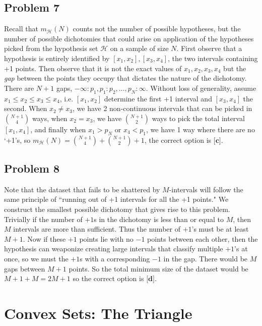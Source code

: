 \documentclass{article}
\begin{document}
\subsection*{Problem 7}
Recall that $m_{\mathcal{H}}(N)$ counts not the number of possible hypotheses, but the number of possible dichotomies that could arise on application of the hypotheses picked from the hypothesis set $\mathcal{H}$ on a sample of size $N$. First observe that a hypothesis is entirely identified by $[x_{1}, x_{2}], [x_{3},x_{4}]$, the two intervals containing +1 points. Then observe that it is not the exact values of $x_{1}, x_{2}, x_{3}, x_{4}$ but the \emph{gap} between the points they occupy that dictates the nature of the dichotomy. There are $N+1$ gaps,  $-\infty : p_{1}, p_{1}:p_{2}, \dots , p_{N}:\infty$. Without loss of generality, assume $x_{1} \leq x_{2} \leq x_{3} \leq x_{4}$, i.e. $[x_{1},x_{2}]$ determine the first +1 interval and $[x_{3},x_{4}]$ the second. When $x_{2} \neq x_{3}$, we have 2 non-continuous intervals that can be picked in ${{N+1}\choose{4}}$ ways, when $x_{2} = x_{3}$, we have ${{N+1}\choose{2}}$ ways to pick the total interval $[x_{1},x_{4}]$, and finally when $x_{1}> p_{N}$ or $x_{4} < p_{1}$, we have 1 way where there are no `+1's, so $m_{\mathcal{H}}(N) = {{N+1}\choose{4}} + {{N+1}\choose{2}} + 1$, the correct option is $\textbf{[c]}$. 
\subsection*{Problem 8}
Note that the dataset that fails to be shattered by $M$-intervals will follow the same principle of ``running out of +1 intervals for all the +1 points." We construct the smallest possible dichotomy that gives rise to this problem. Trivially if the number of $+1$s in the dichotomy is less than or equal to $M$, then $M$ intervals are more than sufficient. Thus the number of $+1$'s must be at least $M+1$. Now if these $+1$ points lie with no $-1$ points between each other, then the hypothesis can weaponize creating large intervals that classify multiple $+1$'s at once, so we must the $+1$s with a corresponding $-1$ in the gap. There would be $M$ gaps between $M+1$ points. So the total minimum size of the dataset would be $M + 1 + M = 2M+1$ so the correct option is $\textbf{[d]}$. 
\newpage
\section*{Convex Sets: The Triangle}
\end{document}
